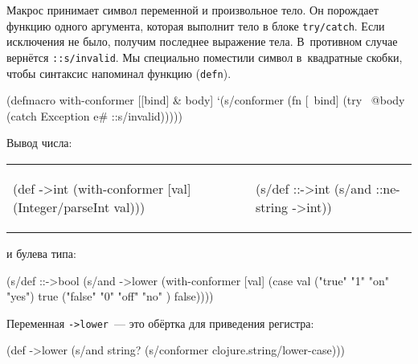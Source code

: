 Макрос принимает символ переменной и произвольное тело. Он порождает функцию
одного аргумента, которая выполнит тело в блоке \verb|try/catch|. Если
исключения не было, получим последнее выражение тела. В~противном случае
вернётся \verb|::s/invalid|. Мы специально поместили символ в~квадратные скобки,
чтобы синтаксис напоминал функцию (\verb|defn|).

\begin{english}
  \begin{clojure}
(defmacro with-conformer
  [[bind] & body]
  `(s/conformer
    (fn [~bind]
      (try
        ~@body
        (catch Exception e#
          ::s/invalid)))))
  \end{clojure}
\end{english}

\noindent
Вывод числа:

\noindent
\begin{tabular}{ @{}p{5cm} @{}p{5cm} }

\begin{english}
  \begin{clojure}
(def ->int
  (with-conformer [val]
    (Integer/parseInt val)))
  \end{clojure}
\end{english}

&

\begin{english}
  \begin{clojure}
(s/def ::->int
  (s/and ::ne-string
         ->int))
  \end{clojure}
\end{english}

\end{tabular}

\noindent
и булева типа:

\begin{english}
  \begin{clojure}
(s/def ::->bool
  (s/and
   ->lower
   (with-conformer [val]
     (case val
       ("true"  "1" "on"  "yes") true
       ("false" "0" "off" "no" ) false))))
  \end{clojure}
\end{english}

\noindent
Переменная \verb|->lower|~--- это обёртка для приведения регистра:

\begin{english}
  \begin{clojure}
(def ->lower
  (s/and
    string?
    (s/conformer clojure.string/lower-case)))
  \end{clojure}
\end{english}

